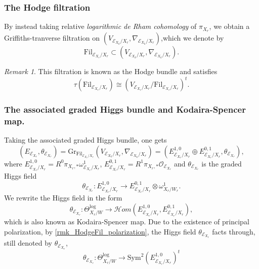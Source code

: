 \documentclass[12pt,twoside]{book}
\theoremstyle{plain}
\theoremstyle{definition}
\theoremstyle{remark}
\newtheorem{remark}[remark]{Remark}
\numberwithin{equation}{section}
\begin{document}
\subsubsection{The Hodge filtration}
By instead taking relative \emph{logarithmic de Rham cohomology} of $\pi_{X_r}$, we obtain a Griffiths-tranverse filtration on $(V_{\mathcal E_{{X_k}}/X_r},\nabla_{\mathcal E_{{X_k}}/X_r})$,which we denote by
\begin{equation}
\label{equ:Fil}
\mathrm{Fil}_{\mathcal E_{X_r}/X_r} \subset (V_{\mathcal E_{{X_k}}/X_r},\nabla_{\mathcal E_{{X_k}}/X_r}).
\end{equation}
\begin{remark}
\label{rmk_HodgeFil_polarization}
This filtration is known as the Hodge bundle and satisfies
\[\tau(\mathrm{Fil}_{\mathcal E_{X_r}/X_r}) \cong \left(V_{\mathcal E_{X_r}/X_r}/\mathrm{Fil}_{\mathcal E_{X_r}/X_r}\right)^t.\]
\end{remark}

\subsubsection{The associated graded Higgs bundle and Kodaira-Spencer map.}
Taking the associated graded Higgs bundle, one gets
\[(E_{\mathcal E_{X_r}},\theta_{\mathcal E_{X_r}})
= \mathrm{Gr}_{\mathrm{Fil}_{\mathcal E_{X_r}/X_r}}
(V_{\mathcal E_{{X_k}}/X_r},\nabla_{\mathcal E_{{X_k}}/X_r})
= (E^{1,0}_{\mathcal E_{X_r}/X_r} \oplus E^{0,1}_{\mathcal E_{X_r}/X_r},\theta_{\mathcal E_{X_r}}),\]
where $E^{1,0}_{\mathcal E_{X_r}/X_r} = R^0\pi_{X_r,*} \omega^1_{\mathcal E_{X_r}/X_r}$, $E^{0,1}_{\mathcal E_{X_r}/X_r} = R^1\pi_{X_r,*} \mathcal O_{\mathcal E_{X_r}}$ and $\theta_{\mathcal E_{X_r}}$ is the graded Higgs field
\[\theta_{\mathcal E_{X_r}}\colon
E^{1,0}_{\mathcal E_{X_r}/X_r}
\rightarrow
E^{0,1}_{\mathcal E_{X_r}/X_r}
\otimes \omega^1_{X_r/W_r}.\]
We rewrite the Higgs field in the form
\[\theta_{\mathcal E_{X_r}}\colon \Theta_{X_r/W}^{\log}\rightarrow \mathcal Hom(E^{1,0}_{\mathcal E_{X_r}/X_r},E^{0,1}_{\mathcal E_{X_r}/X_r}),\]
which is also known as Kodaira-Spencer map.
Due to the existence of principal polarization, by \autoref{rmk_HodgeFil_polarization}, the Higgs field $\theta_{\mathcal E_{X_r}}$ facts through, still denoted by $\theta_{\mathcal E_{X_r}}$,
\[\theta_{\mathcal E_{X_r}} \colon \Theta_{X_r/W}^{\log}\rightarrow \mathrm{Sym}^2 \left(E^{1,0}_{\mathcal E_{X_r}/X_r}\right)^t\]
\end{document}
